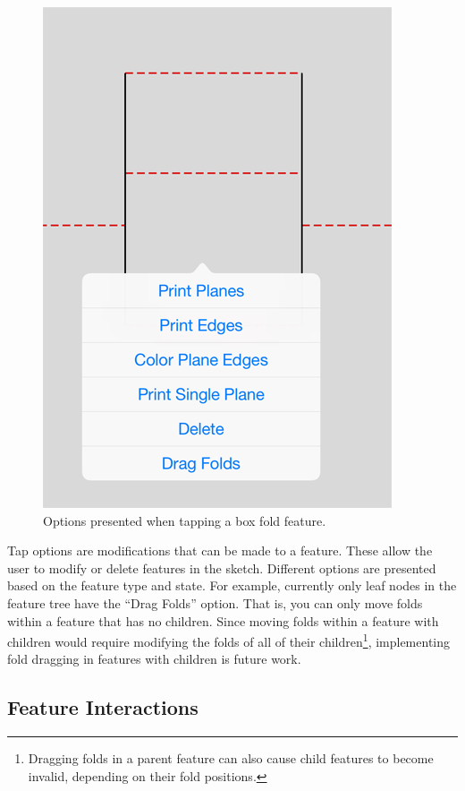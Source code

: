 \begin{figure}[htbp]
\centering
\includegraphics{figures/32_UI_Tool_Interactions/tap-options.png}
\caption{Options presented when tapping a box fold feature.}
\end{figure}

Tap options are modifications that can be made to a feature. These allow
the user to modify or delete features in the sketch. Different options
are presented based on the feature type and state. For example,
currently only leaf nodes in the feature tree have the ``Drag Folds''
option. That is, you can only move folds within a feature that has no
children. Since moving folds within a feature with children would
require modifying the folds of all of their children\footnote{Dragging
  folds in a parent feature can also cause child features to become
  invalid, depending on their fold positions.}, implementing fold
dragging in features with children is future work.

\subsection{Feature Interactions}\label{feature-interactions}

